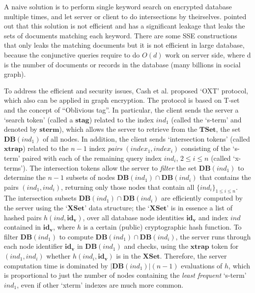 A naive solution is to perform single keyword search on encrypted database multiple times, and let server or client to do intersections by theirselves. \cite{cash2013highly} pointed out that this solution is not efficient and has a significant leakage that leaks the sets of documents matching each keyword. There are some SSE constructions that only leaks the matching documents \cite{curtmola2011searchable} but it is not efficient in large database, because the conjunctive queries require to do $O(d)$ work on server side, where d is the number of documents or records in the database (many billions in social graph). 

To address the efficient and security issues, Cash et al. proposed `OXT' protocol, which also can be applied in graph encryption. The protocol is based on T-set and the concept of ``Oblivious tag''. 
In particular, the client sends the server a `search token' (called a $\mathbf{stag}$) related to the index $ind_1$ (called the `s-term' and denoted by $\mathbf{sterm}$), which allows the server to retrieve from the $\mathbf{TSet}$, the set $\mathbf{DB}(ind_1)$ of all nodes. In addition, the client sends `intersection tokens' (called $\mathbf{xtrap}$) related to the $n-1$ index \emph{pairs} $(index_1,index_i)$ consisting of the `s-term' paired with each of the remaining query index $ind_i$, $2\leq i \leq n$ (called `x-terms'). 
The intersection tokens allow the server to \emph{filter} the set $\mathbf{DB}(ind_1)$ to determine the $n-1$ subsets of nodes $\mathbf{DB}(ind_1) \cap \mathbf{DB}(ind_i)$ that contains the pairs $(ind_1, ind_i)$, returning only those nodes that contain all $\{ind_i\}_{1\leq i\leq n}$. 
The intersection subsets $\mathbf{DB}(ind_1) \cap \mathbf{DB}(ind_i)$ are efficiently computed by the server using the `$\mathbf{XSet}$' data structure; the `$\mathbf{XSet}$' is in essence a list of hashed pairs $h(ind, \mathbf{id_v})$, over all database node identities $\mathbf{id_v}$ and index $ind$ contained in $\mathbf{id_v}$, where $h$ is a certain (public) cryptographic hash function. 
To filter $\mathbf{DB}(ind_1) $ to compute $\mathbf{DB}(ind_1)  \cap  \mathbf{DB}(ind_i)$, the server runs through each node identifier $\mathbf{id_v}$ in $ \mathbf{DB}(ind_1)$ and checks, using the $\mathbf{xtrap}$ token for $(ind_1, ind_i)$ whether $h(ind_i, \mathbf{id_v})$ is in the $\mathbf{XSet}$. 
Therefore, the server computation time is dominated by $|\mathbf{DB}(ind_1)|(n-1)$ evaluations of $h$, which is proportional to just the number of nodes
containing the \emph{least frequent} `s-term' $ind_1$, even if other `xterm' indexes are much more common. 

